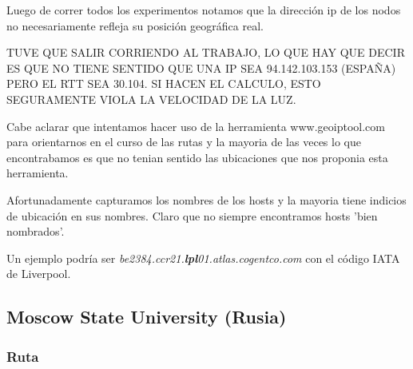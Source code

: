 Luego de correr todos los experimentos notamos que la direcci\'on ip de los nodos
no necesariamente refleja su posici\'on geogr\'afica real.

TUVE QUE SALIR CORRIENDO AL TRABAJO, LO QUE HAY QUE DECIR ES QUE NO TIENE SENTIDO
QUE UNA IP SEA 94.142.103.153 (ESPAÑA) PERO EL RTT SEA 30.104. SI HACEN EL 
CALCULO, ESTO SEGURAMENTE VIOLA LA VELOCIDAD DE LA LUZ.

Cabe aclarar que intentamos hacer uso de la herramienta www.geoiptool.com para orientarnos en 
el curso de las rutas y la mayoria de las veces lo que encontrabamos es que no tenian sentido las 
ubicaciones que nos proponia esta herramienta.

Afortunadamente capturamos los nombres de los hosts y la mayoria tiene indicios de ubicaci\'on en sus
nombres. Claro que no siempre encontramos hosts 'bien nombrados'.

Un ejemplo podr\'ia ser \emph{be2384.ccr21.\textbf{lpl}01.atlas.cogentco.com} con el c\'odigo IATA de 
Liverpool.

\subsection{Moscow State University (Rusia)}

\subsubsection{Ruta}

